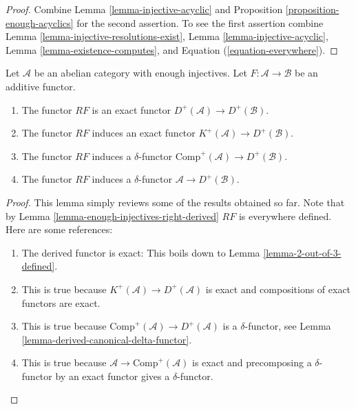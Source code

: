 \begin{proof}
Combine
Lemma \ref{lemma-injective-acyclic}
and
Proposition \ref{proposition-enough-acyclics}
for the second assertion. To see the first assertion combine
Lemma \ref{lemma-injective-resolutions-exist},
Lemma \ref{lemma-injective-acyclic},
Lemma \ref{lemma-existence-computes},
and Equation (\ref{equation-everywhere}).
\end{proof}

\begin{lemma}
\label{lemma-right-derived-properties}
Let $\mathcal{A}$ be an abelian category with enough injectives.
Let $F : \mathcal{A} \to \mathcal{B}$ be an additive functor.
\begin{enumerate}
\item The functor $RF$ is an exact functor
$D^{+}(\mathcal{A}) \to D^{+}(\mathcal{B})$.
\item The functor $RF$ induces an exact functor
$K^{+}(\mathcal{A}) \to D^{+}(\mathcal{B})$.
\item The functor $RF$ induces a $\delta$-functor
$\text{Comp}^{+}(\mathcal{A}) \to D^{+}(\mathcal{B})$.
\item The functor $RF$ induces a $\delta$-functor
$\mathcal{A} \to D^{+}(\mathcal{B})$.
\end{enumerate}
\end{lemma}

\begin{proof}
This lemma simply reviews some of the results obtained so far.
Note that by
Lemma \ref{lemma-enough-injectives-right-derived}
$RF$ is everywhere defined. Here are some references:
\begin{enumerate}
\item The derived functor is exact: This boils down to
Lemma \ref{lemma-2-out-of-3-defined}.
\item This is true because $K^{+}(\mathcal{A}) \to D^{+}(\mathcal{A})$
is exact and compositions of exact functors are exact.
\item This is true because
$\text{Comp}^{+}(\mathcal{A}) \to D^{+}(\mathcal{A})$ is
a $\delta$-functor, see
Lemma \ref{lemma-derived-canonical-delta-functor}.
\item This is true because $\mathcal{A} \to \text{Comp}^{+}(\mathcal{A})$
is exact and precomposing a $\delta$-functor by an exact functor gives
a $\delta$-functor.
\end{enumerate}
\end{proof}

